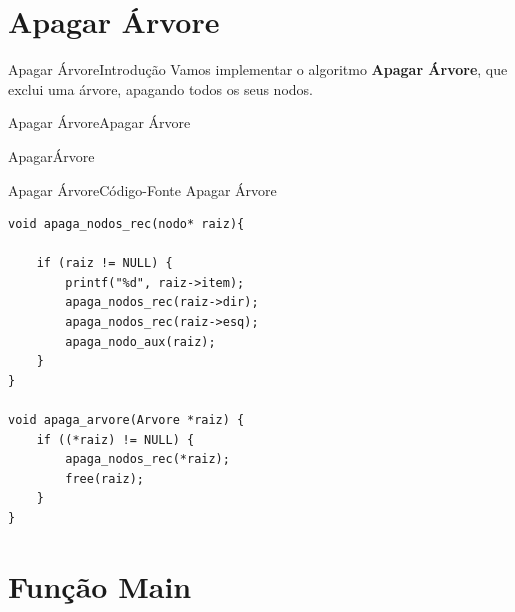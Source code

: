 \documentclass[aspectratio=169]{beamer}
\begin{document}
\section{Apagar Árvore}

\begin{frame}{Apagar Árvore}{Introdução}
Vamos implementar o algoritmo {\bf Apagar Árvore}, que exclui uma árvore, apagando todos os seus nodos.
\end{frame}


\begin{frame}{Apagar Árvore}{Apagar Árvore}
\begin{algorithm}[H]
\caption{ApagarÁrvore} 
\label{ApagarArvore}
\end{algorithm}

\end{frame}

\begin{frame}[fragile]{Apagar Árvore}{Código-Fonte Apagar Árvore}
\begin{lstlisting}[style=CStyle,basicstyle=\small]
void apaga_nodos_rec(nodo* raiz){

    if (raiz != NULL) {
        printf("%d", raiz->item);    
        apaga_nodos_rec(raiz->dir);
        apaga_nodos_rec(raiz->esq);
        apaga_nodo_aux(raiz);
    }
}

void apaga_arvore(Arvore *raiz) {
    if ((*raiz) != NULL) {  
        apaga_nodos_rec(*raiz);
        free(raiz);
    }
}
\end{lstlisting}  
\end{frame}


\section{Função Main}
\end{document}
